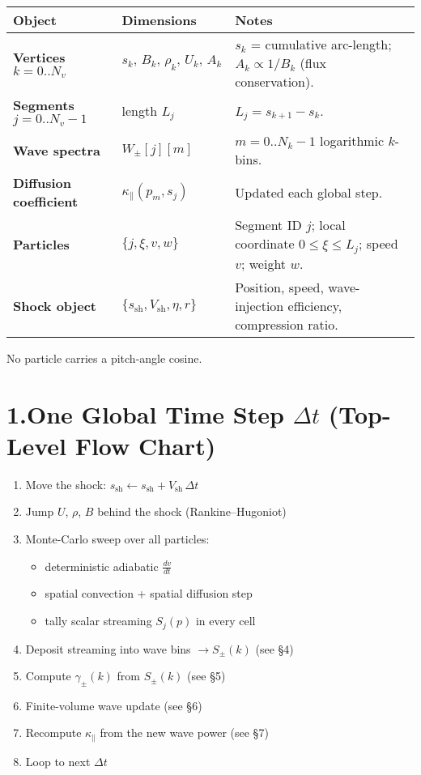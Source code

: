 \begin{tabular}{|p{4cm}|p{4cm}|p{7cm}|}
\hline
\textbf{Object} & \textbf{Dimensions} & \textbf{Notes} \\
\hline
\textbf{Vertices} $k=0..N_v$ & $s_k,\,B_k,\,\rho_k,\,U_k,\,A_k$ & $s_k$ = cumulative arc-length; $A_k\propto 1/B_k$ (flux conservation). \\
\hline
\textbf{Segments} $j=0..N_v-1$ & length $L_j$ & $L_j = s_{k+1} - s_k$. \\
\hline
\textbf{Wave spectra} & $W_{\pm}[j][m]$ & $m=0..N_k-1$ logarithmic $k$-bins. \\
\hline
\textbf{Diffusion coefficient} & $\kappa_\parallel(p_m, s_j)$ & Updated each global step. \\
\hline
\textbf{Particles} & $\{j, \xi, v, w\}$ & Segment ID $j$; local coordinate $0\leq\xi\leq L_j$; speed $v$; weight $w$. \\
\hline
\textbf{Shock object} & $\{s_{\text{sh}}, V_{\text{sh}}, \eta, r\}$ & Position, speed, wave-injection efficiency, compression ratio. \\
\hline
\end{tabular}

No particle carries a pitch-angle cosine.

\section*{1.\quad One Global Time Step $\Delta t$ (Top-Level Flow Chart)}

\begin{enumerate}
\item Move the shock: \( s_{\text{sh}} \leftarrow s_{\text{sh}} + V_{\text{sh}} \, \Delta t \)
\item Jump \( U \), \( \rho \), \( B \) behind the shock (Rankine–Hugoniot)
\item Monte-Carlo sweep over all particles:
    \begin{itemize}
        \item deterministic adiabatic \( \frac{dv}{dt} \)
        \item spatial convection + spatial diffusion step
        \item tally scalar streaming \( S_j(p) \) in every cell
    \end{itemize}
\item Deposit streaming into wave bins \( \rightarrow S_{\pm}(k) \) (see §4)
\item Compute \( \gamma_{\pm}(k) \) from \( S_{\pm}(k) \) (see §5)
\item Finite-volume wave update (see §6)
\item Recompute \( \kappa_{\parallel} \) from the new wave power (see §7)
\item Loop to next \( \Delta t \)
\end{enumerate}


